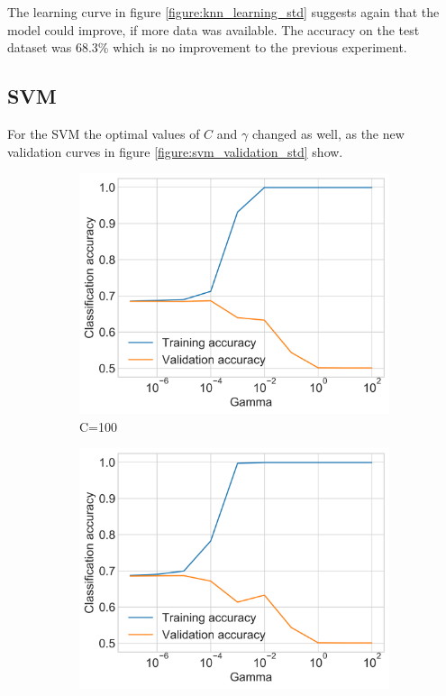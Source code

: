 The learning curve in figure \ref{figure:knn_learning_std} suggests again that the model could improve, if more data was available.
The accuracy on the test dataset was 68.3\% which is no improvement to the previous experiment.

\subsection{\acl{SVM}}
For the \ac{SVM} the optimal values of $C$ and $\gamma$ changed as well, as the new validation curves in figure \ref{figure:svm_validation_std} show.
\begin{figure}[h]
    \begin{subfigure}{0.5\textwidth}
        \centering
        \includegraphics[width=\textwidth]{figures/charts/training_with_std/svm_validation_C_100.png}
        \caption{C=100}
        \label{figure:svm_validation_std_C_100}
    \end{subfigure}
    \begin{subfigure}{0.5\textwidth}
        \centering
        \includegraphics[width=\textwidth]{figures/charts/training_with_std/svm_validation_C_1000.png}

\end{subfigure}
\end{figure}
